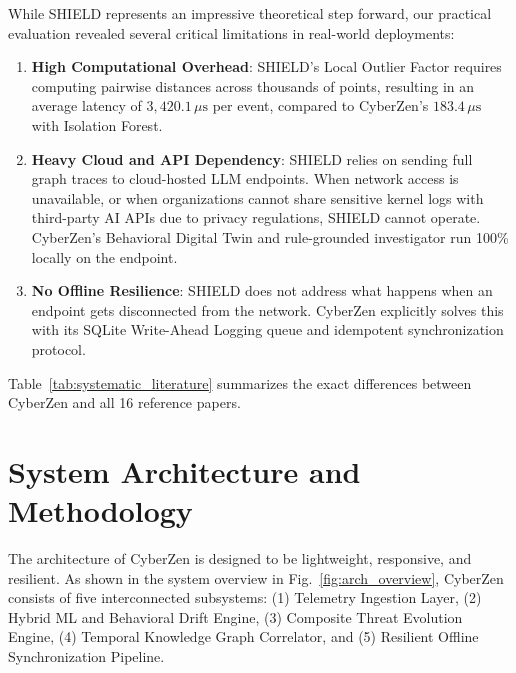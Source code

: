 \documentclass[conference]{IEEEtran}
\begin{document}
While SHIELD represents an impressive theoretical step forward, our practical evaluation revealed several critical limitations in real-world deployments:
\begin{enumerate}
    \item \textbf{High Computational Overhead}: SHIELD's Local Outlier Factor requires computing pairwise distances across thousands of points, resulting in an average latency of $3,420.1\,\mu\text{s}$ per event, compared to CyberZen's $183.4\,\mu\text{s}$ with Isolation Forest.
    \item \textbf{Heavy Cloud and API Dependency}: SHIELD relies on sending full graph traces to cloud-hosted LLM endpoints. When network access is unavailable, or when organizations cannot share sensitive kernel logs with third-party AI APIs due to privacy regulations, SHIELD cannot operate. CyberZen's Behavioral Digital Twin and rule-grounded investigator run 100\% locally on the endpoint.
    \item \textbf{No Offline Resilience}: SHIELD does not address what happens when an endpoint gets disconnected from the network. CyberZen explicitly solves this with its SQLite Write-Ahead Logging queue and idempotent synchronization protocol.
\end{enumerate}
Table~\ref{tab:systematic_literature} summarizes the exact differences between CyberZen and all 16 reference papers.

\section{System Architecture and Methodology}
The architecture of CyberZen is designed to be lightweight, responsive, and resilient. As shown in the system overview in Fig.~\ref{fig:arch_overview}, CyberZen consists of five interconnected subsystems: (1) Telemetry Ingestion Layer, (2) Hybrid ML and Behavioral Drift Engine, (3) Composite Threat Evolution Engine, (4) Temporal Knowledge Graph Correlator, and (5) Resilient Offline Synchronization Pipeline.
\end{document}
